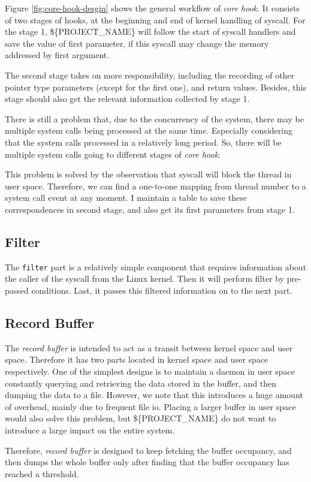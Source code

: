 Figure \ref{fig:core-hook-desgin} shows the general workflow of \textit{core hook}. It consists of two stages of hooks, at the beginning and end of kernel handling of syscall. For the stage 1, \$\{PROJECT\_NAME\} will follow the start of syscall handlers and save the value of first parameter, if this syscall may change the memory addressed by first argument.


The second stage takes on more responsibility, including the recording of other pointer type parameters (except for the first one), and return values. Besides, this stage should also get the relevant information collected by stage 1.

There is still a problem that, due to the concurrency of the system, there may be multiple system calls being processed at the same time. Especially considering that the system calls processed in a relatively long period. So, there will be multiple system calls going to different stages of  \textit{core hook}.

This problem is solved by the observation that syscall will block the thread in user space. Therefore, we can find a one-to-one mapping from thread number to a system call event at any moment. I maintain a table to save these correspondences in second stage, and also get its first parameters from stage 1.

\subsection{Filter}

The \texttt{filter} part is a relatively simple component that requires information about the caller of the syscall from the Linux kernel. Then it will perform filter by pre-passed conditions. Last, it passes this filtered information on to the next part.

\subsection{Record Buffer}

The \textit{record buffer} is intended to act as a transit between kernel space and user space. Therefore it has two parts located in kernel space and user space respectively. One of the simplest designs is to maintain a daemon in user space constantly querying and retrieving the data stored in the buffer, and then dumping the data to a file. However, we note that this introduces a huge amount of overhead, mainly due to frequent file io. Placing a larger buffer in user space would also solve this problem, but \$\{PROJECT\_NAME\} do not want to introduce a large impact on the entire system.

Therefore, \textit{record buffer} is designed to keep fetching the buffer occupancy, and then dumps the whole buffer only after finding that the buffer occupancy has reached a threshold.